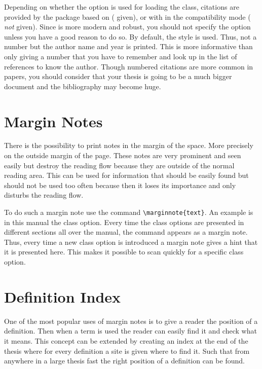 Depending on whether the  option is used for loading the class,
citations are provided by the  package based on 
( given), or with  in the 
compatibility mode ( \emph{not} given). Since 
is more modern and robust, you should not specify the  option
unless you have a good reason to do so. By default, the 
style is used. Thus, not a number but the author name and year is printed.
This is more informative than only giving a number that you have to remember
and look up in the list of references to know the author.  Though numbered
citations are more common in papers, you should consider that your thesis is
going to be a much bigger document and the bibliography may become huge.

\section{Margin Notes}%
\label{cmd:margin}

There is the possibility to print notes in the margin of the space. More
precisely on the outside margin of the page. These notes are very prominent
and seen easily but destroy the reading flow because they are outside of the
normal reading area. This can be used for information that should be easily
found but should not be used too often because then it loses its importance
and only disturbs the reading flow.

To do such a margin note use the command \verb!\marginnote{text}!. An example
is in this manual the class option. Every time the class options are presented
in different sections all over the manual, the command appears as a margin
note.  Thus, every time a new class option is introduced a margin note gives a
hint that it is presented here. This makes it possible to scan quickly for a
specific class option.

\section{Definition Index}%
\label{cmd:defindex}

One of the most popular uses of margin notes is to give a reader the position
of a definition. Then when a term is used the reader can easily find it and
check what it means. This concept can be extended by creating an index at the
end of the thesis where for every definition a  site is given where to find
it. Such that from anywhere in a large thesis fast the right position of a
definition can be found.

